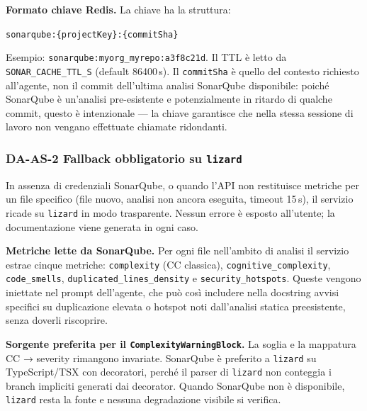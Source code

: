\documentclass[11pt,a4paper]{article}
\begin{document}
\medskip
\noindent\textbf{Formato chiave Redis.} La chiave ha la struttura:
\begin{center}
\texttt{sonarqube:\{projectKey\}:\{commitSha\}}
\end{center}
Esempio: \texttt{sonarqube:myorg\_myrepo:a3f8c21d}. Il TTL è letto da \texttt{SONAR\_CACHE\_TTL\_S} (default 86400\,s). Il \texttt{commitSha} è quello del contesto richiesto all'agente, non il commit dell'ultima analisi SonarQube disponibile: poiché SonarQube è un'analisi pre-esistente e potenzialmente in ritardo di qualche commit, questo è intenzionale --- la chiave garantisce che nella stessa sessione di lavoro non vengano effettuate chiamate ridondanti.

\subsubsection*{DA-AS-2 \textemdash{} Fallback obbligatorio su \texttt{lizard}}
In assenza di credenziali SonarQube, o quando l'API non restituisce metriche per un file specifico (file nuovo, analisi non ancora eseguita, timeout 15\,s), il servizio ricade su \texttt{lizard} in modo trasparente. Nessun errore è esposto all'utente; la documentazione viene generata in ogni caso.

\medskip
\noindent\textbf{Metriche lette da SonarQube.} Per ogni file nell'ambito di analisi il servizio estrae cinque metriche: \texttt{complexity} (CC classica), \texttt{cognitive\_complexity}, \texttt{code\_smells}, \texttt{duplicated\_lines\_density} e \texttt{security\_hotspots}. Queste vengono iniettate nel prompt dell'agente, che può così includere nella docstring avvisi specifici su duplicazione elevata o hotspot noti dall'analisi statica preesistente, senza doverli riscoprire.

\noindent\textbf{Sorgente preferita per il \texttt{ComplexityWarningBlock}.} La soglia e la mappatura CC → severity rimangono invariate. SonarQube è preferito a \texttt{lizard} su TypeScript/TSX con decoratori, perché il parser di \texttt{lizard} non conteggia i branch impliciti generati dai decorator. Quando SonarQube non è disponibile, \texttt{lizard} resta la fonte e nessuna degradazione visibile si verifica.
\end{document}
